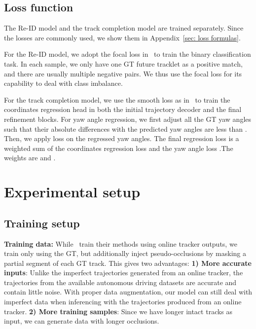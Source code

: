 \documentclass{article} \usepackage{iclr2023_conference,times}
\begin{document}
\vspace{-1mm}
\subsection{Loss function}
\vspace{-1mm}
The Re-ID model and the track completion model are trained separately. Since the losses are commonly used, we show them in  Appendix~\ref{sec: loss formulas}.

For the Re-ID model, we adopt the focal loss in~\cite{focal_loss} to train the binary classification task. In each sample, we only have one GT future tracklet as a positive match, and there are usually multiple negative pairs. We thus use the focal loss for its capability to deal with class imbalance. 

For the track completion model, we use the smooth  loss as in~\cite{DCMS,laneGCN} to train the coordinates regression head in both the initial trajectory decoder and the final refinement blocks. For yaw angle regression, we first adjust all the GT yaw angles such that their absolute differences with the predicted yaw angles are less than . Then, we apply  loss on the regressed yaw angles. The final regression loss  is a weighted sum of the coordinates regression loss  and the yaw angle loss .The weights are  and .

\vspace{-1mm}
\section{Experimental setup}
\vspace{-1mm}

\subsection{Training setup}
\vspace{-1mm}
\textbf{Training data:}
While~\cite{offboard_labeling,Auto4d} train their methods using online tracker outputs, we train only using the GT, but additionally inject pseudo-occlusions by masking a partial segment of each GT track.
This gives two advantages: 
\textbf{1) More accurate inputs}:
Unlike the imperfect trajectories generated from an online tracker, the trajectories from the available autonomous driving datasets are accurate and contain little noise.
With proper data augmentation, our model can still deal with imperfect data when inferencing with the trajectories produced from an online tracker.
\textbf{2) More training samples}: Since we have longer intact tracks as input, we can generate data with longer occlusions.
\end{document}
